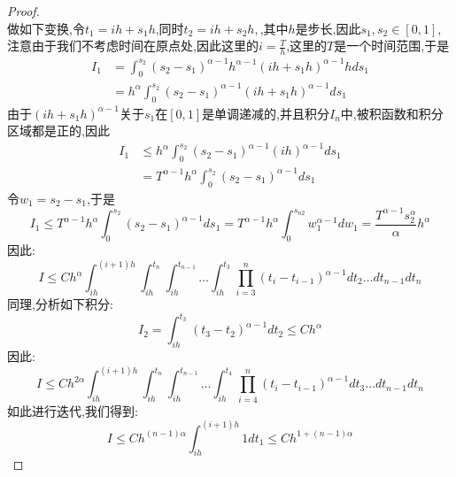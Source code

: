\begin{proof}
\begin{equation*}
	\end{equation*}
	做如下变换,令$t_{1} = ih + s_{1}h$,同时$t_2 = ih + s_2h ,$,其中$h$是步长,因此$s_1,s_{2} \in [0,1]$,注意由于我们不考虑时间在原点处,因此这里的$i=\frac{T}{h}$,这里的$T$是一个时间范围,于是
	\begin{align*}
		I_1 &= \int_{0}^{s_{2}} (s_{2}-s_{1})^{\alpha -1}h^{\alpha -1} (ih + s_1h)^{\alpha - 1}h ds_1 \\
		&= h^{\alpha}\int_{0}^{s_{2}} (s_{2}-s_{1})^{\alpha -1} (ih + s_1h)^{\alpha - 1} ds_1
	\end{align*}
	由于$(ih + s_1h)^{\alpha - 1}$关于$s_1$在$[0,1]$是单调递减的,并且积分$I_n$中,被积函数和积分区域都是正的,因此
	\begin{align*}
		I_1 &\le h^{\alpha}\int_{0}^{s_{2}} (s_{2}-s_{1})^{\alpha -1} (ih)^{\alpha - 1} ds_1 \\
		&=  T^{\alpha - 1}h^{\alpha}\int_{0}^{s_{2}} (s_{2}-s_{1})^{\alpha -1} ds_1
	\end{align*}
	令$w_1=s_{2}-s_{1}$,于是
	\begin{equation*}
		I_1\le T^{\alpha - 1}h^{\alpha}\int_{0}^{s_{2}} (s_{2}-s_{1})^{\alpha -1} ds_1
		=  T^{\alpha - 1}h^{\alpha}\int_{0}^{s_{n2}} w_1^{\alpha -1} dw_1
		=  \frac{T^{\alpha - 1}s_{2}^\alpha}{\alpha}h^{\alpha}
	\end{equation*}
	因此:
	\begin{equation*}
		I \le Ch^\alpha
		\int_{ih}^{(i+1)h}\int_{ih}^{t_n}\int_{ih}^{t_{n-1}} \ldots \int_{ih}^{t_{3}} 
		\prod_{i=3}^{n}(t_i-t_{i-1})^{\alpha -1} dt_{2} \ldots dt_{n-1}dt_n
	\end{equation*}
	同理,分析如下积分:
	\begin{equation*}
		I_{2} = \int_{ih}^{t_{3}}(t_{3}-t_{2})^{\alpha -1}
		dt_{2} \le Ch^\alpha 
	\end{equation*}
	因此:
	\begin{equation*}
		I \le Ch^{2\alpha}
		\int_{ih}^{(i+1)h}\int_{ih}^{t_n}\int_{ih}^{t_{n-1}} \ldots \int_{ih}^{t_{4}} 
		\prod_{i=4}^{n}(t_i-t_{i-1})^{\alpha -1} dt_{3} \ldots dt_{n-1}dt_n
	\end{equation*}
	如此进行迭代,我们得到:
	\begin{equation*}
		I \le Ch^{(n-1)\alpha}\int_{ih}^{(i+1)h} 1 dt_1 \le Ch^{1+(n-1)\alpha}
	\end{equation*}
\end{proof}

